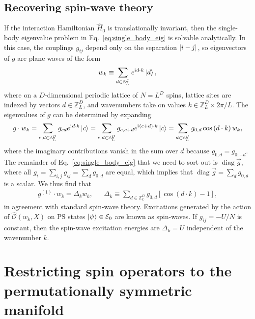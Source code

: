 \documentclass[aps,pra,nofootinbib,twocolumn,superscriptaddress]{revtex4-2}
\newcommand{\p}[1]{\left(#1\right)} %
\renewcommand{\sp}[1]{\left[#1\right]} %
\renewcommand{\i}{\mathrm{i}\mkern1mu} %
\newcommand{\1}{\mathds{1}}
\renewcommand{\H}{\hat H}
\renewcommand{\O}{\hat{\mathcal{O}}}
\newcommand{\ZZ}{\mathbb{Z}}
\newcommand{\E}{\mathcal{E}}
\DeclareMathOperator{\diag}{diag}
\begin{document}
\subsection{Recovering spin-wave theory}
\label{sec:spin_wave}

If the interaction Hamiltonian $\H_0$ is translationally invariant, then the single-body eigenvalue problem in Eq.~\eqref{eq:single_body_eig} is solvable analytically.
In this case, the couplings $g_{ij}$ depend only on the separation $\abs{i-j}$, so eigenvectors of $g$ are plane waves of the form
\begin{align}
  w_k \equiv \sum_{d\in\ZZ_L^D} e^{\i d\cdot k} \ket{d},
\end{align}
where on a $D$-dimensional periodic lattice of $N=L^D$ spins, lattice sites are indexed by vectors $d\in\ZZ_L^D$, and wavenumbers take on values $k\in\ZZ_L^D\times2\pi/L$.
The eigenvalues of $g$ can be determined by expanding
\begin{align}
  g \cdot w_k
  = \sum_{c,d\in\ZZ_L^D} g_{cd} e^{\i d\cdot k} \ket{c}
  = \sum_{c,d\in\ZZ_L^D} g_{c,c+d} e^{\i\p{c+d}\cdot k} \ket{c}
  = \sum_{d\in\ZZ_L^D} g_{0,d} \cos\p{d\cdot k} w_k,
\end{align}
where the imaginary contributions vanish in the sum over $d$ because $g_{0,d}=g_{0,-d}$.
The remainder of Eq.~\eqref{eq:single_body_eig} that we need to sort out is $\diag\vec g$, where all $g_i = \sum_{i,j}g_{ij} = \sum_d g_{0,d}$ are equal, which implies that $\diag\vec g = \sum_d g_{0,d}$ is a scalar.
We thus find that
\begin{align}
  g^{(1)} \cdot w_k = \Delta_k w_k,
  &&
  \Delta_k \equiv \sum_{d\in\ZZ_L^D} g_{0,d} \sp{\cos\p{d\cdot k}-1},
\end{align}
in agreement with standard spin-wave theory.
Excitations generated by the action of $\O\p{w_k,X}$ on PS states $\ket\psi\in\E_0$ are known as spin-waves.
If $g_{ij}=-U/N$ is constant, then the spin-wave excitation energies are $\Delta_k=U$ independent of the wavenumber $k$.

\section{Restricting spin operators to the permutationally symmetric manifold}
\label{sec:PS_ops}
\end{document}

